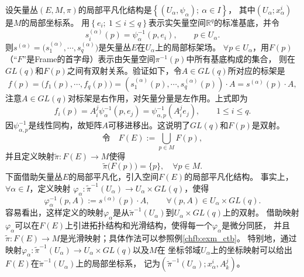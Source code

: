 设矢量丛$(E,M,\pi)$的局部平凡化结构是$\left\{\left(U_{\alpha}, \psi_{\alpha}\right) ;\  \alpha \in I\right\}$，
其中$\left(U_{\alpha} ; x_{\alpha}^{i}\right)$是$M$的局部坐标系。
用$\left\{e_{i} ;\ 1 \leqslant i \leqslant q\right\}$表示实矢量空间$\mathbb{R}^{q}$的标准基底，并令
\begin{equation}
    s_{i}^{(\alpha)}(p)=\psi_{\alpha}^{-1}\left(p, e_{i}\right), \qquad p \in U_{\alpha} .
\end{equation}
则$s^{(\alpha)}=\bigl(s_{1}^{(\alpha)}, \cdots, s_{q}^{(\alpha)}\bigr)$是矢量丛$E$在$U_{\alpha}$上的局部标架场。
$\forall p \in U_{\alpha}$，用$F(p)$（“$F$”是Frame的首字母）表示由矢量空间$\pi^{-1}(p)$中所有基底构成的集合，
则在$GL(q)$和$F(p)$之间有双射关系。验证如下，令$A \in GL(q)$所对应的标架是
\begin{equation}\label{chfb:eqn_F-comp}
    f(p)  =\bigl(f_{1}(p), \cdots, f_{q}(p)\bigr)
    =\left(s_{1}^{(\alpha)}(p), \cdots, s_{q}^{(\alpha)}(p)\right) \cdot A = s^{(\alpha)}(p) \cdot A,
\end{equation}
注意$A \in GL(q)$对标架是右作用，对矢量分量是左作用。上式即为
\begin{equation}
    f_{i}(p)=A_{i}^{j} \psi_{\alpha}^{-1}(p, e_{j})
    =\psi_{\alpha, p}^{-1} (A_{i}^{j} e_{j}), \qquad 1 \leqslant i \leqslant q .
\end{equation}
因$\psi_{\alpha, p}^{-1}$是线性同构，故矩阵$A$可移进移出。这说明了$GL(q)$和$F(p)$是双射。
\begin{equation}
    \text{令}\quad  F(E) := \bigcup_{p \in M} F(p) ,
\end{equation}
并且定义映射$\tilde{\pi}: F(E) \rightarrow M$使得
\begin{equation}
    \tilde{\pi}\bigl(F(p)\bigr)=\{p\} , \quad \forall p \in M.
\end{equation}
下面借助矢量丛$E$的局部平凡化，引入空间$F(E)$的局部平凡化结构。
事实上，$\forall \alpha \in I$，定义映射
$\varphi_{\alpha}: \tilde{\pi}^{-1}(U_{\alpha})\to U_{\alpha} \times GL(q) $，使得
\begin{equation}
    \varphi_{\alpha}^{-1}(p, A) := s^{(\alpha)}(p)
     \cdot A, \qquad \forall(p, A) \in U_{\alpha} \times GL(q) .
\end{equation}
容易看出，这样定义的映射$\varphi_{\alpha}$是从$\tilde{\pi}^{-1}\left(U_{\alpha}\right)$到$U_{\alpha} \times GL(q)$上的双射。
借助映射$\varphi_{\alpha}$可以在$F(E)$上引进拓扑结构和光滑结构，使得每一个$\varphi_{\alpha}$是微分同胚，
并且$\tilde{\pi}: F(E) \rightarrow M$是光滑映射；具体作法可以参照例\ref{chfb:exm_ctb}。
特别地，通过映射$\varphi_{\alpha}: \tilde{\pi}^{-1}(U_{\alpha}) \rightarrow U_{\alpha} \times GL(q)$以及$M$在
坐标邻域$U_{\alpha}$上的坐标映射可以给出$F(E)$在$\tilde{\pi}^{-1}(U_{\alpha})$上的局部坐标系，
记为$\left(\tilde{\pi}^{-1}\left(U_{\alpha}\right) ; x_{\alpha}^{i}, A_{k}^{j} \right)$。

